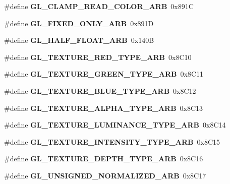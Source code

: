 \begin{DoxyCompactItemize}
\item 
\#define {\bfseries G\+L\+\_\+\+C\+L\+A\+M\+P\+\_\+\+R\+E\+A\+D\+\_\+\+C\+O\+L\+O\+R\+\_\+\+A\+R\+B}~0x891\+C\label{_s_d_l__opengl_8h_aef0447e2b4b0129865639b38175cc102}

\item 
\#define {\bfseries G\+L\+\_\+\+F\+I\+X\+E\+D\+\_\+\+O\+N\+L\+Y\+\_\+\+A\+R\+B}~0x891\+D\label{_s_d_l__opengl_8h_a48400d825fd69d2d826fc252ffbdd315}

\item 
\#define {\bfseries G\+L\+\_\+\+H\+A\+L\+F\+\_\+\+F\+L\+O\+A\+T\+\_\+\+A\+R\+B}~0x140\+B\label{_s_d_l__opengl_8h_aae212f7434dae4eb914939d36e2f8caa}

\item 
\#define {\bfseries G\+L\+\_\+\+T\+E\+X\+T\+U\+R\+E\+\_\+\+R\+E\+D\+\_\+\+T\+Y\+P\+E\+\_\+\+A\+R\+B}~0x8\+C10\label{_s_d_l__opengl_8h_ad2d20d37b2195b0eaefc2587ff64a5a2}

\item 
\#define {\bfseries G\+L\+\_\+\+T\+E\+X\+T\+U\+R\+E\+\_\+\+G\+R\+E\+E\+N\+\_\+\+T\+Y\+P\+E\+\_\+\+A\+R\+B}~0x8\+C11\label{_s_d_l__opengl_8h_a66fe3f1c6d18d5ad4630ec0f9090fe9f}

\item 
\#define {\bfseries G\+L\+\_\+\+T\+E\+X\+T\+U\+R\+E\+\_\+\+B\+L\+U\+E\+\_\+\+T\+Y\+P\+E\+\_\+\+A\+R\+B}~0x8\+C12\label{_s_d_l__opengl_8h_a14014e5586666595be69a8635b6aad5c}

\item 
\#define {\bfseries G\+L\+\_\+\+T\+E\+X\+T\+U\+R\+E\+\_\+\+A\+L\+P\+H\+A\+\_\+\+T\+Y\+P\+E\+\_\+\+A\+R\+B}~0x8\+C13\label{_s_d_l__opengl_8h_ad20aa9abc01ab6feccc73d932b5d9fae}

\item 
\#define {\bfseries G\+L\+\_\+\+T\+E\+X\+T\+U\+R\+E\+\_\+\+L\+U\+M\+I\+N\+A\+N\+C\+E\+\_\+\+T\+Y\+P\+E\+\_\+\+A\+R\+B}~0x8\+C14\label{_s_d_l__opengl_8h_a0df197cd740341f8f6d2ec4b840e65f2}

\item 
\#define {\bfseries G\+L\+\_\+\+T\+E\+X\+T\+U\+R\+E\+\_\+\+I\+N\+T\+E\+N\+S\+I\+T\+Y\+\_\+\+T\+Y\+P\+E\+\_\+\+A\+R\+B}~0x8\+C15\label{_s_d_l__opengl_8h_a75fbfcd1a5c5f71baa7d8e67e12505a5}

\item 
\#define {\bfseries G\+L\+\_\+\+T\+E\+X\+T\+U\+R\+E\+\_\+\+D\+E\+P\+T\+H\+\_\+\+T\+Y\+P\+E\+\_\+\+A\+R\+B}~0x8\+C16\label{_s_d_l__opengl_8h_a8515fe4165f642997c12487a3fc2debf}

\item 
\#define {\bfseries G\+L\+\_\+\+U\+N\+S\+I\+G\+N\+E\+D\+\_\+\+N\+O\+R\+M\+A\+L\+I\+Z\+E\+D\+\_\+\+A\+R\+B}~0x8\+C17\label{_s_d_l__opengl_8h_a5ac453c9bc4026c116e656bcd51fcee6}


\end{DoxyCompactItemize}
